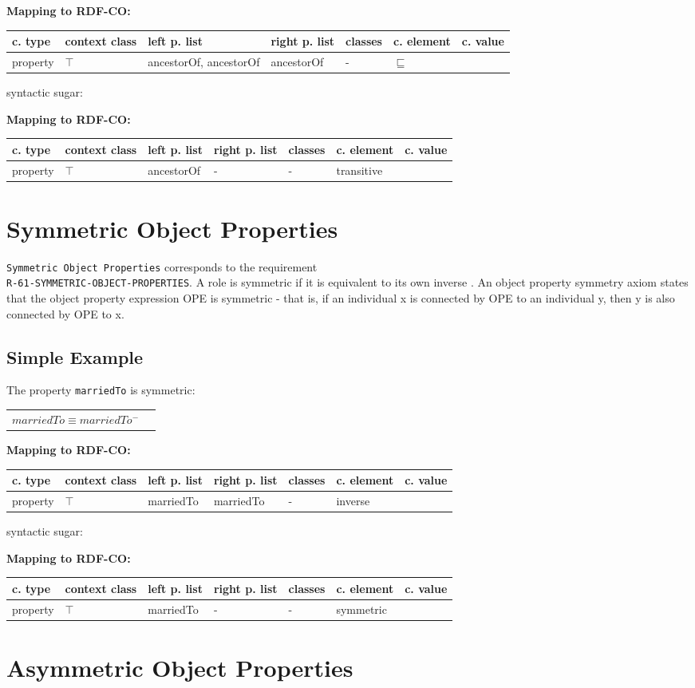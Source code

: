 \documentclass{llncs}
\newcommand{\ms}[1]{\texttt{#1}}
\newenvironment{gcotable}{
  \scriptsize
  \sffamily
  \vspace{0cm}
	\begin{center}
	\textbf{\vspace{0.4cm}Mapping to RDF-CO:} \\
  \begin{tabular}{l|l|l|l|l|l|l}
	\hline
  \textbf{c. type} & \textbf{context class} & \textbf{left p. list} & \textbf{right p. list} & \textbf{classes} & \textbf{c. element} & \textbf{c. value} \\
  \hline

}{
  \hline
  \end{tabular}
	\end{center}
}
\newenvironment{DL}{
  \vspace{0cm}
	\begin{center}
  \begin{tabular}{r l}

}{
  \end{tabular}
	\end{center}
}
\begin{document}
\begin{gcotable}
property & $\top$ & ancestorOf, ancestorOf & ancestorOf & - & $\sqsubseteq$ \\
\end{gcotable}

syntactic sugar:

\begin{gcotable}
property & $\top$ & ancestorOf & - & - & transitive \\
\end{gcotable}

\section{Symmetric Object Properties}

\ms{Symmetric Object Properties} corresponds to the requirement \\
\ms{R-61-SYMMETRIC-OBJECT-PROPERTIES}.
A role is symmetric if it is equivalent to its own inverse \cite{Kroetzsch2012}.
An object property symmetry axiom states that the object property expression OPE is symmetric - that is, if an individual x is connected by OPE to an individual y, then y is also connected by OPE to x. 	

\subsection{Simple Example}

The property \ms{marriedTo} is symmetric:

\begin{DL}
$marriedTo \equiv marriedTo^{-}$ \\
\end{DL}

\begin{gcotable}
property & $\top$ & marriedTo & marriedTo & - & inverse \\
\end{gcotable}

syntactic sugar:

\begin{gcotable}
property & $\top$ & marriedTo & - & - & symmetric \\
\end{gcotable}

\section{Asymmetric Object Properties}
\end{document}
